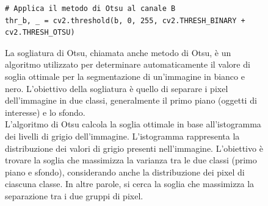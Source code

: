 \documentclass[a4paper,12pt]{report}
\begin{document}
\begin{figure}
\begin{flushleft}
\begin{lstlisting}
# Applica il metodo di Otsu al canale B
thr_b, _ = cv2.threshold(b, 0, 255, cv2.THRESH_BINARY + cv2.THRESH_OTSU)
          \end{lstlisting}

          La sogliatura di Otsu, chiamata anche metodo di Otsu, è un algoritmo utilizzato per determinare automaticamente il valore di soglia ottimale per la segmentazione di un'immagine in bianco e nero.
          L'obiettivo della sogliatura è quello di separare i pixel dell'immagine in due classi, generalmente il primo piano (oggetti di interesse) e lo sfondo.
          \\
          L'algoritmo di Otsu calcola la soglia ottimale in base all'istogramma dei livelli di grigio dell'immagine.
          L'istogramma rappresenta la distribuzione dei valori di grigio presenti nell'immagine.
          L'obiettivo è trovare la soglia che massimizza la varianza tra le due classi (primo piano e sfondo), considerando anche la distribuzione dei pixel di ciascuna classe. In altre parole, si cerca la soglia che massimizza la separazione tra i due gruppi di pixel.

        \end{flushleft}
      \end{figure}
\end{document}
